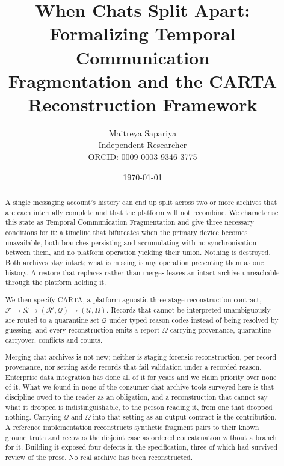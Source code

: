 \documentclass[11pt,a4paper]{article}
\title{When Chats Split Apart: Formalizing Temporal Communication\\
Fragmentation and the CARTA Reconstruction Framework}
\author{%
  Maitreya Sapariya\\
  Independent Researcher\\
  \href{https://orcid.org/0009-0003-9346-3775}{ORCID: 0009-0003-9346-3775}%
}
\date{\today}
\newcommand{\carta}{\ensuremath{%
  \mathcal{F} \rightarrow \mathcal{R} \rightarrow (\mathcal{R}', \mathcal{Q})
  \rightarrow (\mathcal{U}, \Omega)}}
\begin{document}
\maketitle

\begin{abstract}
A single messaging account's history can end up split across two or more
archives that are each internally complete and that the platform will not
recombine. We
characterise this state as Temporal Communication Fragmentation and give three
necessary conditions for it: a timeline that bifurcates when the primary device
becomes unavailable, both branches persisting and accumulating with no
synchronisation between them, and no platform operation yielding their union.
Nothing is destroyed. Both archives stay intact; what is missing is any
operation presenting them as one history. A restore that replaces rather than
merges leaves an intact archive unreachable through the platform holding it.

We then specify CARTA, a platform-agnostic three-stage reconstruction contract,
\carta. Records that cannot be interpreted unambiguously are routed to a
quarantine set $\mathcal{Q}$ under typed reason codes instead of being resolved
by guessing, and every reconstruction emits a report $\Omega$ carrying
provenance, quarantine carryover, conflicts and counts.

Merging chat archives is not new; neither is staging forensic reconstruction,
per-record provenance, nor setting aside records that fail validation under a
recorded reason. Enterprise data integration has done all of it for years and we
claim priority over none of it. What we found in none of the consumer
chat-archive tools surveyed here is that discipline owed to the reader as an
obligation, and a reconstruction that cannot say what it dropped is
indistinguishable, to the person reading it, from one that dropped nothing.
Carrying $\mathcal{Q}$ and $\Omega$ into that setting as an output contract is
the contribution. A reference implementation reconstructs synthetic fragment
pairs to their known ground truth and recovers the disjoint case as ordered
concatenation without a branch for it. Building it exposed four defects in the
specification, three of which had survived review of the prose. No real archive
has been reconstructed.
\end{abstract}
\end{document}
